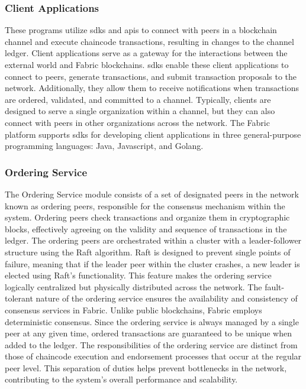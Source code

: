\documentclass[conference]{IEEEtran}
\begin{document}
\subsubsection{Client Applications}
These programs utilize \ac{sdk}s and \ac{api}s to connect with peers in a blockchain channel and execute chaincode transactions, resulting in changes to the channel ledger. Client applications serve as a gateway for the interactions between the external world and Fabric blockchains. \ac{sdk}s enable these client applications to connect to peers, generate transactions, and submit transaction proposals to the network. Additionally, they allow them to receive notifications when transactions are ordered, validated, and committed to a channel. Typically, clients are designed to serve a single organization within a channel, but they can also connect with peers in other organizations across the network. The Fabric platform supports \ac{sdk}s for developing client applications in three general-purpose programming languages: Java, Javascript, and Golang. \\

\subsubsection{Ordering Service}
The Ordering Service module consists of a set of designated peers in the network known as ordering peers, responsible for the consensus mechanism within the system. Ordering peers check transactions and organize them in cryptographic blocks, effectively agreeing on the validity and sequence of transactions in the ledger. The ordering peers are orchestrated within a cluster with a leader-follower structure using the Raft algorithm. Raft is designed to prevent single points of failure, meaning that if the leader peer within the cluster crashes, a new leader is elected using Raft's functionality. This feature makes the ordering service logically centralized but physically distributed across the network. The fault-tolerant nature of the ordering service ensures the availability and consistency of consensus services in Fabric. Unlike public blockchains, Fabric employs deterministic consensus. Since the ordering service is always managed by a single peer at any given time, ordered transactions are guaranteed to be unique when added to the ledger. The responsibilities of the ordering service are distinct from those of chaincode execution and endorsement processes that occur at the regular peer level. This separation of duties helps prevent bottlenecks in the network, contributing to the system's overall performance and scalability. \\
\end{document}
